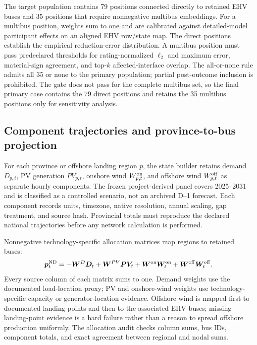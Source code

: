 \documentclass[10pt,journal]{IEEEtran}
\begin{document}
The target population contains 79 positions connected directly to retained EHV buses and 35 positions that require nonnegative multibus embeddings. For a multibus position, weights sum to one and are calibrated against detailed-model participant effects on an aligned EHV row/state map. The direct positions establish the empirical reduction-error distribution. A multibus position must pass predeclared thresholds for rating-normalized $\ell_2$ and maximum error, material-sign agreement, and top-$k$ affected-interface overlap. The all-or-none rule admits all 35 or none to the primary population; partial post-outcome inclusion is prohibited. The gate does not pass for the complete multibus set, so the final primary case contains the 79 direct positions and retains the 35 multibus positions only for sensitivity analysis.

\subsection{Component trajectories and province-to-bus projection}

For each province or offshore landing region $p$, the state builder retains demand $D_{p,t}$, PV generation $PV_{p,t}$, onshore wind $W_{p,t}^{\rm on}$, and offshore wind $W_{p,t}^{\rm off}$ as separate hourly components. The frozen project-derived panel covers 2025--2031 and is classified as a controlled scenario, not an archived D--1 forecast. Each component records units, timezone, native resolution, annual scaling, gap treatment, and source hash. Provincial totals must reproduce the declared national trajectories before any network calculation is performed.

Nonnegative technology-specific allocation matrices map regions to retained buses:
\begin{equation}
\bm p_t^{\rm ND}
=-\bm W^D\bm D_t
+\bm W^{PV}\bm{PV}_t
+\bm W^{\rm on}\bm W_t^{\rm on}
+\bm W^{\rm off}\bm W_t^{\rm off}.
\label{eq:pnd}
\end{equation}
Every source column of each matrix sums to one. Demand weights use the documented load-location proxy; PV and onshore-wind weights use technology-specific capacity or generator-location evidence. Offshore wind is mapped first to documented landing points and then to the associated EHV buses; missing landing-point evidence is a hard failure rather than a reason to spread offshore production uniformly. The allocation audit checks column sums, bus IDs, component totals, and exact agreement between regional and nodal sums.
\end{document}
